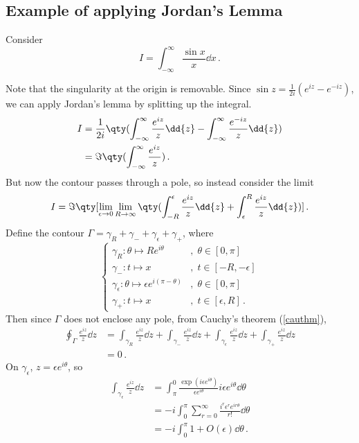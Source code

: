 \documentclass{article}
\theoremstyle{plain}\theoremheaderfont{\normalfont\itshape}\theorembodyfont{\rmfamily}\theoremseparator{.}\newtheorem*{rem}{Remark}\newtheorem*{ex}{Example}\newtheorem*{proof}{Proof}\newtheorem*{altp}{Alternative proof}
\theoremstyle{plain}\theoremheaderfont{\normalfont\bfseries}\theorembodyfont{\rmfamily}\theoremseparator{.}\newtheorem{thm}{Theorem}[section]\newtheorem{lem}[thm]{Lemma}\newtheorem{prop}[thm]{Proposition}\newtheorem*{cor}{Corollary}\newtheorem{defn}[thm]{Definition}\newtheorem{clm}[thm]{Claim}\newtheorem{clminproof}{Claim}
\theoremstyle{break}\theoremheaderfont{\normalfont\itshape}\theorembodyfont{\rmfamily}\theoremseparator{.\medskip}\newtheorem*{proofskip}{Proof}\newtheorem*{exs}{Examples}\newtheorem*{rems}{Remarks}
\theoremstyle{break}\theoremheaderfont{\normalfont\bfseries}\theorembodyfont{\rmfamily}\theoremseparator{.\medskip}\newtheorem{lemskip}[thm]{Lemma}\newtheorem{defnskip}[thm]{Definition}\newtheorem{propskip}[thm]{Proposition}\newtheorem{thmskip}[thm]{Theorem}
\numberwithin{equation}{section}
\begin{document}
	\subsection{Example of applying Jordan's Lemma}
	Consider
	\[I=\int_{-\infty}^{\infty}\frac{\sin x}{x}\dd{x}\,.\]

	Note that the singularity at the origin is removable. Since \(\sin z=\frac{1}{2i}(e^{iz}-e^{-iz})\), we can apply Jordan's lemma by splitting up the integral.
	\begin{align*}
		I&=\frac{1}{2i}\qty(\int_{-\infty}^{\infty}\frac{e^{iz}}{z}\dd{z}-\int_{-\infty}^{\infty}\frac{e^{-iz}}{z}\dd{z})\\
		&=\Im\qty(\int_{-\infty}^{\infty}\frac{e^{iz}}{z})\,.
	\end{align*}
	But now the contour passes through a pole, so instead consider the limit
	\begin{align*}
		I=\Im\qty[\lim_{\epsilon\to 0}\lim_{R\to\infty}\qty(\int_{-R}^{\epsilon}\frac{e^{iz}}{z}\dd{z}+\int_{\epsilon}^{R}\frac{e^{iz}}{z}\dd{z})]\,.
	\end{align*}
	Define the contour \(\Gamma=\gamma_R+\gamma_-+\gamma_\epsilon+\gamma_+\), where
	\[\begin{cases}
		\gamma_R:\theta\mapsto Re^{i\theta} &,\;\theta\in[0,\pi]\\
		\gamma_-:t\mapsto x &,\;t\in[-R,-\epsilon]\\
		\gamma_\epsilon:\theta\mapsto\epsilon e^{i(\pi-\theta)} &,\;\theta\in[0,\pi]\\
		\gamma_+:t\mapsto x &,\;t\in[\epsilon,R]\,.
	\end{cases}\]
	Then since \(\Gamma\) does not enclose any pole, from Cauchy's theorem (\cref{cauthm}),
	\begin{align*}
		\oint_\Gamma\frac{e^{iz}}{z}\dd{z}&=\int_{\gamma_R}\frac{e^{iz}}{z}\dd{z}+\int_{\gamma_-}\frac{e^{iz}}{z}\dd{z}+\int_{\gamma_\epsilon}\frac{e^{iz}}{z}\dd{z}+\int_{\gamma_+}\frac{e^{iz}}{z}\dd{z}\\
		&=0\,.
	\end{align*}
	On \(\gamma_\epsilon\), \(z=\epsilon e^{i\theta}\), so
	\begin{align*}
		\int_{\gamma_\epsilon}\frac{e^{iz}}{z}\dd{z}&=\int_{\pi}^{0}\frac{\exp(i\epsilon e^{i\theta})}{\epsilon e^{i\theta}}i\epsilon e^{i\theta}\dd{\theta}\\
		&=-i\int_{0}^{\pi}\sum_{r=0}^{\infty}\frac{i^r\epsilon^r e^{ir\theta}}{r !}\dd{\theta}\\
		&=-i\int_{0}^{\pi}1+O(\epsilon)\dd\theta\,.
	\end{align*}
\end{document}

